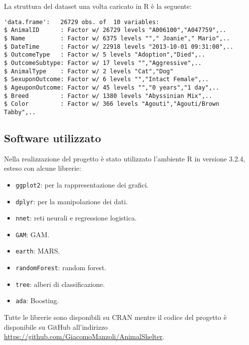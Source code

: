 La struttura del dataset una volta caricato in R è la seguente:

\begin{verbatim}
'data.frame':	26729 obs. of  10 variables:
$ AnimalID      : Factor w/ 26729 levels "A006100","A047759",..
$ Name          : Factor w/ 6375 levels ""," Joanie"," Mario",..
$ DateTime      : Factor w/ 22918 levels "2013-10-01 09:31:00",..
$ OutcomeType   : Factor w/ 5 levels "Adoption","Died",..
$ OutcomeSubtype: Factor w/ 17 levels "","Aggressive",..
$ AnimalType    : Factor w/ 2 levels "Cat","Dog"
$ SexuponOutcome: Factor w/ 6 levels "","Intact Female",..
$ AgeuponOutcome: Factor w/ 45 levels "","0 years","1 day",..
$ Breed         : Factor w/ 1380 levels "Abyssinian Mix",..
$ Color         : Factor w/ 366 levels "Agouti","Agouti/Brown Tabby",..
\end{verbatim}

\subsection{Software utilizzato}

Nella realizzazione del progetto è stato utilizzato l'ambiente R in versione 3.2.4, esteso con alcune librerie:

\begin{itemize}
	\item \texttt{ggplot2}: per la rappresentazione dei grafici.
	\item \texttt{dplyr}: per la manipolazione dei dati.
	\item \texttt{nnet}: reti neurali e regressione logistica.
	\item \texttt{GAM}: GAM.
	\item \texttt{earth}: MARS.
	\item \texttt{randomForest}: random forest.
	\item \texttt{tree}: alberi di classificazione.
	\item \texttt{ada}: Boosting.
\end{itemize}

Tutte le librerie sono disponibili su CRAN mentre il codice del progetto è disponibile su GitHub all'indirizzo \url{https://github.com/GiacomoManzoli/AnimalShelter}.